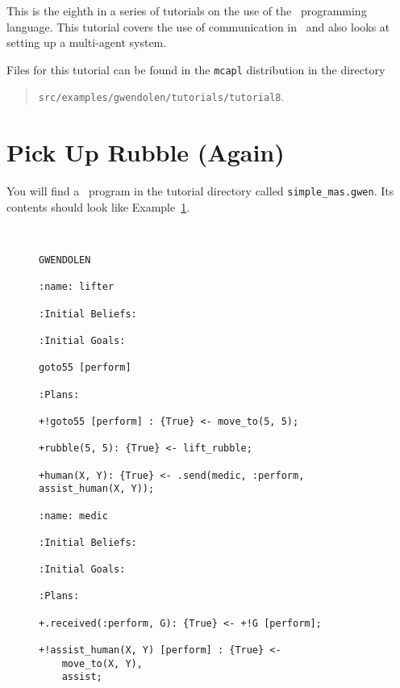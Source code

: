 \label{tutorial:gwendolen:communication}
This is the eighth in a series of tutorials on the use of the \gwendolen\ programming language.  This tutorial covers the use of communication in \gwendolen\ and also looks at setting up a multi-agent system.

Files for this tutorial can be found in the \texttt{mcapl} distribution in the directory 
\begin{quote}
\texttt{src/examples/gwendolen/tutorials/tutorial8}.
\end{quote}

\section{Pick Up Rubble (Again)}

\begin{sloppypar}
You will find a \gwendolen\ program in the tutorial directory called \texttt{simple\_mas.gwen}.  Its contents should look like Example~\ref{code:simple_mas}.
\end{sloppypar}
\begin{figure}[htb]
\begin{ourexample}
\label{code:simple_mas} \quad \\
\begin{lstlisting}[basicstyle=\sffamily,style=easslisting,language=Gwendolen]
GWENDOLEN

:name: lifter

:Initial Beliefs:

:Initial Goals:

goto55 [perform]

:Plans:

+!goto55 [perform] : {True} <- move_to(5, 5);

+rubble(5, 5): {True} <- lift_rubble;

+human(X, Y): {True} <- .send(medic, :perform, assist_human(X, Y));

:name: medic

:Initial Beliefs:

:Initial Goals:

:Plans:

+.received(:perform, G): {True} <- +!G [perform];

+!assist_human(X, Y) [perform] : {True} <- 
	move_to(X, Y),
	assist;
\end{lstlisting}
\end{ourexample}
\end{figure}

